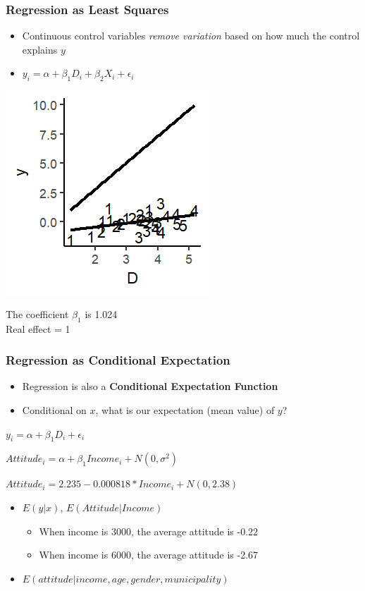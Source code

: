 \documentclass[xcolor=x11names,compress]{beamer}\usepackage[]{graphicx}\usepackage[]{color}
\makeatletter
\def\maxwidth{ %
  \ifdim\Gin@nat@width>\linewidth
    \linewidth
  \else
    \Gin@nat@width
  \fi
}
\newenvironment{knitrout}{}{} %
\renewcommand{\(}{\begin{columns}}
\renewcommand{\)}{\end{columns}}
\newcommand{\<}[1]{\begin{column}{#1}}
\renewcommand{\>}{\end{column}}
\makeatother
\begin{document}
\begin{frame}
\frametitle{Regression as Least Squares}
\begin{itemize}
\item Continuous control variables \textit{remove variation} based on how much the control explains $y$
\item $y_i = \alpha + \beta_1 D_i + \beta_2 X_i + \epsilon_i$
\end{itemize}
\begin{multicols}{2}
\begin{knitrout}
\color{fgcolor}
\includegraphics[width=\maxwidth]{figure/graph_ols_control3-1} 

\end{knitrout}
\columnbreak

The coefficient $\beta_1$ is 1.024 \\
Real effect = 1
\end{multicols}
\end{frame}

\begin{frame}
\frametitle{Regression as Conditional Expectation}
\begin{itemize}
\item Regression is also a \textbf{Conditional Expectation Function}
\pause
\item Conditional on $x$, what is our expectation (mean value) of $y$?
\end{itemize}
\begin{center}
\item $y_i = \alpha + \beta_1 D_i + \epsilon_i$
\pause
\item $Attitude_i = \alpha + \beta_1 Income_i + N(0,\sigma^2)$
\pause
\item $Attitude_i = 2.235 - 0.000818 * Income_i + N(0,2.38)$
\pause
\end{center}
\begin{itemize}
\item $E(y|x)$, \pause  $E(Attitude | Income)$
\begin{itemize}
\item When income is 3000, the average attitude is -0.22
\item When income  is 6000, the average attitude is -2.67
\end{itemize}
\item $E(attitude|income,age,gender,municipality)$
\end{itemize}
\end{frame}
\end{document}
